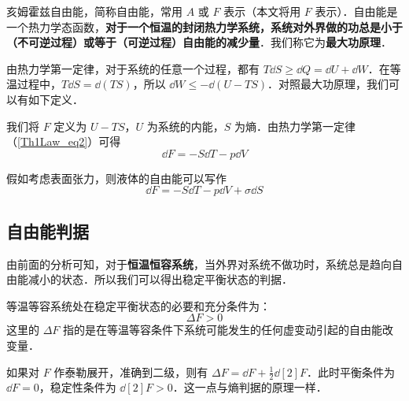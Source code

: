 

亥姆霍兹自由能，简称自由能，常用 $A$ 或 $F$ 表示（本文将用 $F$ 表示）．自由能是一个热力学态函数，\textbf{对于一个恒温的封闭热力学系统，系统对外界做的功总是小于（不可逆过程）或等于（可逆过程）自由能的减少量}．我们称它为\textbf{最大功原理}．

由热力学第一定律，对于系统的任意一个过程，都有 $T\dd S\ge \dd Q=\dd U+\dd W$．在等温过程中，$T\dd S=\dd (TS)$，所以 $\dd W\le - \dd (U-TS)$．对照最大功原理，我们可以有如下定义．

我们将 $F$ 定义为 $U-TS$，$U$ 为系统的内能，$S$ 为熵．由热力学第一定律（\autoref{Th1Law_eq2}）可得
\begin{equation}
\dd F=-S\dd T-p\dd V
\end{equation}

假如考虑表面张力，则液体的自由能可以写作
\begin{equation}
\dd F=-S\dd T-p \dd V+\sigma \dd S
\end{equation}
\subsection{自由能判据}
由前面的分析可知，对于\textbf{恒温恒容系统}，当外界对系统不做功时，系统总是趋向自由能减小的状态．所以我们可以得出稳定平衡状态的判据．

等温等容系统处在稳定平衡状态的必要和充分条件为：
\begin{equation}
\Delta F>0
\end{equation}
这里的 $\Delta F$ 指的是在等温等容条件下系统可能发生的任何虚变动引起的自由能改变量．

如果对 $F$ 作泰勒展开，准确到二级，则有 $\Delta F=\dd F+\frac{1}{2}\dd[2]{F}$．此时平衡条件为 $\dd F=0$，稳定性条件为 $\dd[2]{F}>0$．这一点与熵判据的原理一样．
